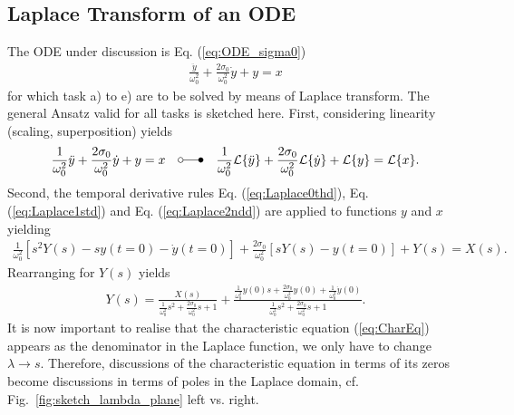 \documentclass[a4paper,11pt,oneside]{scrartcl}
\newcommand{\eq}[1]{Eq. (\ref{#1})}
\begin{document}
\subsection{Laplace Transform of an ODE}
The ODE under discussion is \eq{eq:ODE_sigma0}
\begin{align}
\frac{\ddot{y}}{\omega_0^2} + \frac{2 \sigma_0}{\omega_0^2} \dot{y} + y = x
\end{align}
for which task a) to e) are to be solved by means of Laplace transform.
The general Ansatz valid for all tasks is sketched here.
%
First, considering linearity (scaling, superposition) yields
\begin{align}
\frac{1}{\omega_0^2} \ddot{y} +
\frac{2 \sigma_0}{\omega_0^2} \dot{y} + y = x
\quad \laplace \quad
\frac{1}{\omega_0^2} \mathcal{L}\{\ddot{y}\} +
\frac{2 \sigma_0}{\omega_0^2} \mathcal{L}\{\dot{y}\} + \mathcal{L}\{y\} =
\mathcal{L}\{x\}.
\end{align}
%
Second, the temporal derivative rules \eq{eq:Laplace0thd}, \eq{eq:Laplace1std}
and \eq{eq:Laplace2ndd} are applied to functions $y$ and $x$ yielding
\begin{align}
\frac{1}{\omega_0^2} \left[ s^2 Y(s) - s y(t=0) - \dot{y}(t=0)\right]  +
\frac{2 \sigma_0}{\omega_0^2} \left[ s Y(s) - y(t=0) \right] + Y(s) = X(s).
\end{align}
%
Rearranging for $Y(s)$ yields
\begin{align}
Y(s) = \frac{X(s)}{\frac{1}{\omega_0^2} s^2 +
\frac{2 \sigma_0}{\omega_0^2} s + 1}
+ \frac{\frac{1}{\omega_0^2} y(0) s + \frac{2 \sigma_0}{\omega_0^2} y(0) +
\frac{1}{\omega_0^2}\dot{y}(0)}{\frac{1}
{\omega_0^2} s^2 + \frac{2 \sigma_0}{\omega_0^2} s + 1}.
\end{align}
%
It is now important to realise that the characteristic equation (\ref{eq:CharEq})
appears as the denominator in the Laplace function, we only have to change
$\lambda\rightarrow s$.
Therefore, discussions of the characteristic equation in terms of its zeros become
discussions in terms of poles in the Laplace domain,
cf. Fig.~\ref{fig:sketch_lambda_plane} left vs. right.
\end{document}
